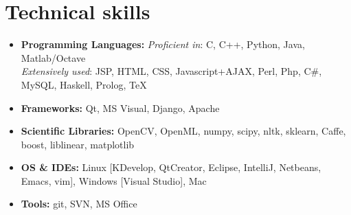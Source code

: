 \documentclass[10pt,letterpaper,sans]{moderncv}        %
\begin{document}
\section{Technical skills}

\vspace{2pt}

\begin{itemize}

\item \textbf{Programming Languages:} \emph{Proficient in}: C, C++, Python, Java, Matlab/Octave \\ \emph{Extensively used}: JSP, HTML, CSS, Javascript+AJAX, Perl, Php, C\#, MySQL, Haskell, Prolog, TeX

\item \textbf{Frameworks:} Qt, MS Visual, Django, Apache

\item \textbf{Scientific Libraries:} OpenCV, OpenML, numpy, scipy, nltk, sklearn, Caffe, boost, liblinear, matplotlib

\item \textbf{OS \& IDEs:} Linux [KDevelop, QtCreator, Eclipse, IntelliJ, Netbeans, Emacs, vim], Windows [Visual Studio], Mac

\item \textbf{Tools:} git, SVN, MS Office

\end{itemize}
\end{document}
